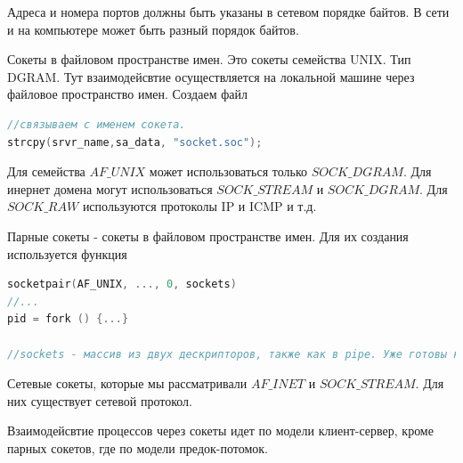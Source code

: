 Адреса и номера портов должны быть указаны в сетевом порядке байтов. В сети и на компьютере может быть разный порядок байтов.

Сокеты в файловом пространстве имен. Это сокеты семейства UNIX. Тип DGRAM. Тут взаимодейсвтие осуществляется на локальной машине через файловое пространство имен. Создаем файл

\begin{lstlisting}[language=c]
//связываем с именем сокета.
strcpy(srvr_name,sa_data, "socket.soc");
\end{lstlisting}

Для семейства $AF\_UNIX$ может использоваться только $SOCK\_DGRAM$. Для инернет домена могут использоваться $SOCK\_STREAM$ и $SOCK\_DGRAM$. Для $SOCK\_RAW$  используются протоколы IP и ICMP и т.д.

Парные сокеты - сокеты в файловом пространстве имен. Для их создания используется функция 

\begin{lstlisting}[language=c]
socketpair(AF_UNIX, ..., 0, sockets)
//...
pid = fork () {...}

//sockets - массив из двух дескрипторов, также как в pipe. Уже готовы к передаче данных и можно сразу применять системные вызовы read/write. fork получает оба дескрпитора, один из которых он должен закрыть с помощью системного вызова close. Несмотря на то, что не используется модель клиент-сервер, которая характерная для сокетов, но если посомтреть, то функция socketpair получает семейство и тип, на основании которых определяется протокол, поэтому считаются полноценными сокетами. Это сделано для общности подхода реализации взаимодейсвтия через сокеты.
\end{lstlisting}

Сетевые сокеты, которые мы рассматривали $AF\_INET$ и $SOCK\_STREAM$. Для них существует сетевой протокол.

Взаимодейсвтие процессов через сокеты идет по модели клиент-сервер, кроме парных сокетов, где по модели предок-потомок.

